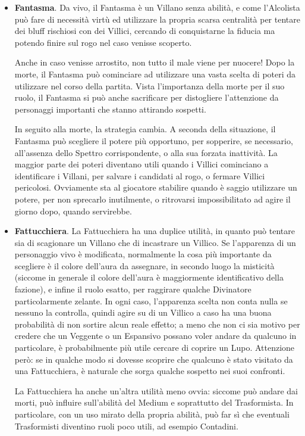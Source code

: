\documentclass[a4paper,10pt]{article}
\begin{document}
\begin{itemize}
	\item {\bf Fantasma}. Da vivo, il Fantasma è un Villano senza abilità, e come l'Alcolista può fare di necessità virtù ed utilizzare la propria scarsa centralità per tentare dei bluff rischiosi con dei Villici, cercando di conquistarne la fiducia ma potendo finire sul rogo nel caso venisse scoperto.
	
	Anche in caso venisse arrostito, non tutto il male viene per nuocere! Dopo la morte, il Fantasma può cominciare ad utilizzare una vasta scelta di poteri da utilizzare nel corso della partita. Vista l'importanza della morte per il suo ruolo, il Fantasma si può anche sacrificare per distogliere l'attenzione da personaggi importanti che stanno attirando sospetti.
	
	In seguito alla morte, la strategia cambia. A seconda della situazione, il Fantasma può scegliere il potere più opportuno, per sopperire, se necessario, all'assenza dello Spettro corrispondente, o alla sua forzata inattività. La maggior parte dei poteri diventano utili quando i Villici cominciano a identificare i Villani, per salvare i candidati al rogo, o fermare Villici pericolosi. Ovviamente sta al giocatore stabilire quando è saggio utilizzare un potere, per non sprecarlo inutilmente, o ritrovarsi impossibilitato ad agire il giorno dopo, quando servirebbe.
	
	\item {\bf Fattucchiera}. La Fattucchiera ha una duplice utilità, in quanto può tentare sia di scagionare un Villano che di incastrare un Villico. Se l'apparenza di un personaggio vivo è modificata, normalmente la cosa più importante da scegliere è il colore dell'aura da assegnare, in secondo luogo la misticità (siccome in generale il colore dell'aura è maggiormente identificativo della fazione), e infine il ruolo esatto, per raggirare qualche Divinatore particolarmente zelante. In ogni caso, l'apparenza scelta non conta nulla se nessuno la controlla, quindi agire su di un Villico a caso ha una buona probabilità di non sortire alcun reale effetto; a meno che non ci sia motivo per credere che un Veggente o un Espansivo possano voler andare da qualcuno in particolare, è probabilmente più utile cercare di coprire un Lupo. Attenzione però: se in qualche modo si dovesse scoprire che qualcuno è stato visitato da una Fattucchiera, è naturale che sorga qualche sospetto nei suoi confronti.

    La Fattucchiera ha anche un'altra utilità meno ovvia: siccome può andare dai morti, può influire sull'abilità del Medium e soprattutto del Trasformista. In particolare, con un uso mirato della propria abilità, può far sì che eventuali Trasformisti diventino ruoli poco utili, ad esempio Contadini.


\end{itemize}
\end{document}
